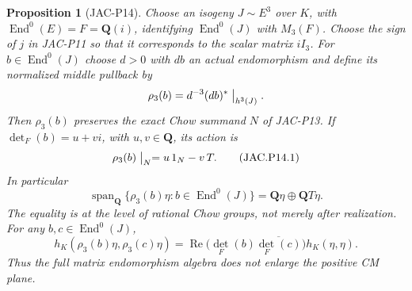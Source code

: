 \documentclass[11pt,a4paper]{article}
\newtheorem{proposition}[theorem]{Proposition}
\begin{document}
\begin{proposition}[JAC-P14]\label{jac:P14}
Choose an isogeny $J\sim E^3$ over $K$, with
$\operatorname{End}^0(E)=F=\mathbf Q(i)$, identifying
$\operatorname{End}^0(J)$ with $M_3(F)$. Choose the sign of $j$
in JAC-P11 so that it corresponds to the scalar matrix $iI_3$.
For $b\in\operatorname{End}^0(J)$ choose $d>0$ with $db$ an
actual endomorphism and define its normalized middle pullback by
\[
 \rho_3(b)=d^{-3}(db)^*\bigm|_{h^3(J)}.
\]
Then $\rho_3(b)$ preserves the exact Chow summand $N$ of JAC-P13.
If $\det_F(b)=u+vi$, with $u,v\in\mathbf Q$, its action is
\[
 \rho_3(b)\bigm|_N=u\,1_N-v\,T.                       \tag{JAC.P14.1}
\]
In particular
\[
 \operatorname{span}_{\mathbf Q}
   \{\rho_3(b)\eta:b\in\operatorname{End}^0(J)\}
        =\mathbf Q\eta\oplus\mathbf Q T\eta.           \tag{JAC.P14.2}
\]
The equality is at the level of rational Chow groups, not merely
after realization. For any $b,c\in\operatorname{End}^0(J)$,
\[
 h_K(\rho_3(b)\eta,\rho_3(c)\eta)
   =\operatorname{Re}
       \bigl(\det_F(b)\overline{\det_F(c)}\bigr)
      h_K(\eta,\eta).                                \tag{JAC.P14.3}
\]
Thus the full matrix endomorphism algebra does not enlarge the
positive CM plane.
\end{proposition}
\end{document}
